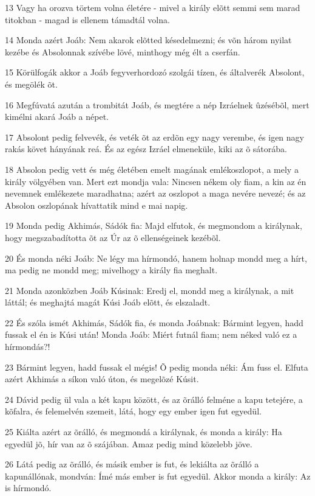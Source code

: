 \par 13 Vagy ha orozva törtem volna életére - mivel a király elõtt semmi sem marad titokban - magad is ellenem támadtál volna.
\par 14 Monda azért Joáb: Nem akarok elõtted késedelmezni; és võn három nyilat kezébe és Absolonnak szívébe lövé, minthogy még élt a cserfán.
\par 15 Körülfogák akkor a Joáb fegyverhordozó szolgái tízen, és általverék Absolont, és megölék õt.
\par 16 Megfúvatá azután a trombitát Joáb, és megtére a nép Izráelnek ûzésébõl, mert kimélni akará Joáb a népet.
\par 17 Absolont pedig felvevék, és veték õt az erdõn egy nagy verembe, és igen nagy rakás követ hányának reá. És az egész Izráel elmeneküle, kiki az õ sátorába.
\par 18 Absolon pedig vett és még életében emelt magának emlékoszlopot, a mely a király völgyében van. Mert ezt mondja vala: Nincsen nékem oly fiam, a kin az én nevemnek emlékezete maradhatna; azért az oszlopot a maga nevére nevezé; és az Absolon oszlopának hívattatik mind e mai napig.
\par 19 Monda pedig Akhimás, Sádók fia: Majd elfutok, és megmondom a királynak, hogy megszabadította õt az Úr az õ ellenségeinek kezébõl.
\par 20 És monda néki Joáb: Ne légy ma hírmondó, hanem holnap mondd meg a hírt, ma pedig ne mondd meg; mivelhogy a király fia meghalt.
\par 21 Monda azonközben Joáb Kúsinak: Eredj el, mondd meg a királynak, a mit láttál; és meghajtá magát Kúsi Joáb elõtt, és elszaladt.
\par 22 És szóla ismét Akhimás, Sádók fia, és monda Joábnak: Bármint legyen, hadd fussak el én is Kúsi után! Monda Joáb: Miért futnál fiam; nem néked való ez a hírmondás?!
\par 23 Bármint legyen, hadd fussak el mégis! Õ pedig monda néki: Ám fuss el. Elfuta azért Akhimás a síkon való úton, és megelõzé Kúsit.
\par 24 Dávid pedig ül vala a két kapu között, és az õrálló felméne a kapu tetejére, a kõfalra, és felemelvén szemeit, látá, hogy egy ember igen fut egyedül.
\par 25 Kiálta azért az õrálló, és megmondá a királynak, és monda a király: Ha egyedül jõ, hír van az õ szájában. Amaz pedig mind közelebb jöve.
\par 26 Látá pedig az õrálló, és másik ember is fut, és lekiálta az õrálló a kapunállónak, mondván: Ímé más ember is fut egyedül. Akkor monda a király: Az is hírmondó.
